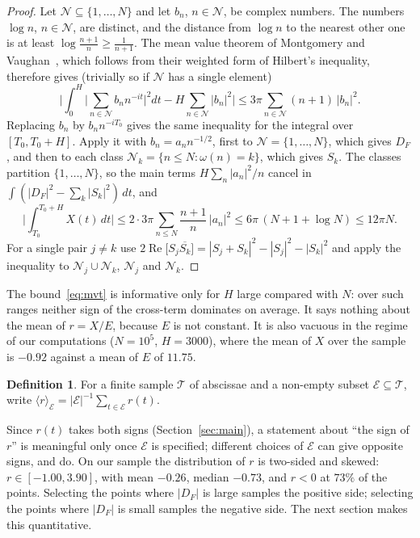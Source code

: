\documentclass[11pt]{amsart}
\theoremstyle{definition}
\newtheorem{definition}[theorem]{Definition}
\theoremstyle{remark}
\newcommand{\re}{\operatorname{Re}}
\begin{document}
\begin{proof}
Let $\mathcal N\subseteq\{1,\dots,N\}$ and let $b_n$, $n\in\mathcal N$,
be complex numbers. The numbers $\log n$, $n\in\mathcal N$, are distinct,
and the distance from $\log n$ to the nearest other one is at least
$\log\frac{n+1}{n}\ge\frac1{n+1}$. The mean value theorem of Montgomery
and Vaughan~\cite{MV74}, which follows from their weighted
form of Hilbert's inequality, therefore gives (trivially so if
$\mathcal N$ has a single element)
\begin{equation*}
\bigg|\int_{0}^{H}\Big|\sum_{n\in\mathcal N}b_n n^{-it}\Big|^2dt
-H\sum_{n\in\mathcal N}|b_n|^2\bigg|
\le 3\pi\sum_{n\in\mathcal N}(n+1)\,|b_n|^2 .
\end{equation*}
Replacing $b_n$ by $b_nn^{-iT_0}$ gives the same inequality for the
integral over $[T_0,T_0+H]$. Apply it with $b_n=a_nn^{-1/2}$, first to
$\mathcal N=\{1,\dots,N\}$, which gives $D_F$, and then to each class
$\mathcal N_k=\{n\le N:\omega(n)=k\}$, which gives $S_k$. The classes
partition $\{1,\dots,N\}$, so the main terms $H\sum_{n}|a_n|^2/n$ cancel
in $\int(|D_F|^2-\sum_k|S_k|^2)\,dt$, and
\[
\bigg|\int_{T_0}^{T_0+H}X(t)\,dt\bigg|
\le 2\cdot3\pi\sum_{n\le N}\frac{n+1}{n}\,|a_n|^2
\le 6\pi\,(N+1+\log N)\le 12\pi N .
\]
For a single pair $j\ne k$ use
$2\re\big[S_j\overline{S_k}\big]=|S_j+S_k|^2-|S_j|^2-|S_k|^2$ and apply
the inequality to $\mathcal N_j\cup\mathcal N_k$, $\mathcal N_j$ and
$\mathcal N_k$.
\end{proof}

\noindent
The bound~\eqref{eq:mvt} is informative only for $H$ large compared with
$N$: over such ranges neither sign of the cross-term dominates on
average. It says nothing about the mean of $r=X/E$, because $E$ is not
constant. It is also vacuous in the regime of our computations
($N=10^5$, $H=3000$), where the mean of $X$ over the sample is $-0.92$
against a mean of $E$ of $11.75$.

\begin{definition}\label{cor:signfree}
For a finite sample $\mathcal T$ of abscissae and a non-empty subset
$\mathcal E\subseteq\mathcal T$, write
$\langle r\rangle_{\mathcal E}=|\mathcal E|^{-1}\sum_{t\in\mathcal E}r(t)$.
\end{definition}

Since $r(t)$ takes both signs (Section~\ref{sec:main}), a statement about
``the sign of $r$'' is meaningful only once $\mathcal E$ is specified;
different choices of $\mathcal E$ can give opposite signs, and do.
On our sample the distribution of $r$ is two-sided and skewed:
$r\in[-1.00,3.90]$, with mean $-0.26$, median $-0.73$, and $r<0$ at $73\%$
of the points. Selecting the points where $|D_F|$ is large samples the
positive side; selecting the points where $|D_F|$ is small samples the
negative side. The next section makes this quantitative.
\end{document}
